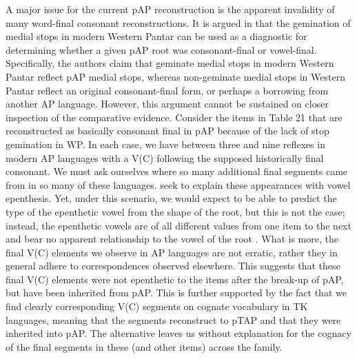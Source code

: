 A major issue for the current pAP reconstruction is the apparent invalidity of many word-final consonant reconstructions. It is argued in \citet[95]{HoltonEtAl2012} that the gemination of medial stops in modern Western Pantar can be used as a diagnostic for determining whether a given pAP root was consonant-final or vowel-final. Specifically, the authors claim that geminate medial stops in modern Western Pantar reflect pAP medial stops, whereas non-geminate medial stops in Western Pantar reflect an original consonant-final form, or perhaps a borrowing from another AP language. However, this argument cannot be sustained on closer inspection of the comparative evidence. Consider the items in Table 21 that are reconstructed as basically consonant final in pAP because of the lack of stop gemination in WP. In each case, we have between three and nine reflexes in modern AP languages with a V(C) following the supposed historically final consonant. We must ask ourselves where so many additional final segments came
from in so many of these languages. \citet{HoltonEtAl2012} seek to explain these appearances with vowel epenthesis. Yet, under this scenario, we would expect to be able to predict the type of the epenthetic vowel from the shape of the root, but this is not the case; instead, the epenthetic vowels are of all different values from one item to the next and bear no apparent relationship to the vowel of the root \citep[as defined by][]{HoltonEtAl2012}. What is more, the final V(C) elements we observe in AP languages are not erratic, rather they in general adhere to correspondences observed elsewhere. This suggests that these final V(C) elements were not epenthetic to the items after the break-up of pAP, but have been inherited from pAP. This is further supported by the fact that we find clearly corresponding V(C) segments on cognate vocabulary in TK languages, meaning that the segments reconstruct to pTAP and that they were inherited into pAP. The alternative leaves us without explanation for the cognacy of the final
segments in these (and other items) across the family.


